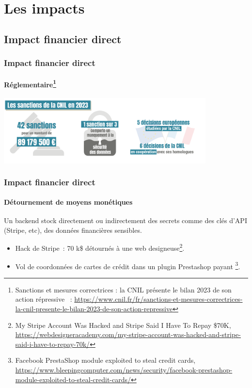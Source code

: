 \documentclass{beamer}
\begin{document}
    \section{Les impacts}\label{sec:les-impacts}

    \subsection{Impact financier direct}\label{subsec:impact-financier-direct}
    \begin{frame}
        \frametitle{Impact financier direct}
        \framesubtitle{Réglementaire\footnote{Sanctions et mesures correctrices : la CNIL présente le bilan 2023 de son action répressive ~: \url{https://www.cnil.fr/fr/sanctions-et-mesures-correctrices-la-cnil-presente-le-bilan-2023-de-son-action-repressive}}}
        \transdissolve
        \centering
        \includegraphics[width=11cm]{image/sanctions-cnil-2023}
    \end{frame}

    \begin{frame}
        \frametitle{Impact financier direct}
        \framesubtitle{Détournement de moyens monétiques}
        \transdissolve
        Un backend stock directement ou indirectement des secrets comme des clés d'API (Stripe, etc), des données financières sensibles.
        \begin{itemize}
            \item Hack de Stripe~: 70 k\$ détournés à une web designeuse\footnote{My Stripe Account Was Hacked and Stripe Said I Have To Repay \$70K, \url{https://webdesigneracademy.com/my-stripe-account-was-hacked-and-stripe-said-i-have-to-repay-70k/}}.
            \item Vol de coordonnées de cartes de crédit dans un plugin Prestashop payant \footnote{Facebook PrestaShop module exploited to steal credit cards, \url{https://www.bleepingcomputer.com/news/security/facebook-prestashop-module-exploited-to-steal-credit-cards/}}.
        \end{itemize}
    \end{frame}
\end{document}
